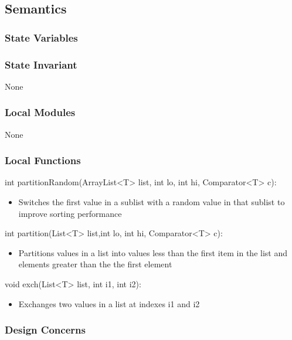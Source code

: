 \documentclass[12pt]{article}
\begin{document}
                \subsection* {Semantics}
                
                \subsubsection* {State Variables}
                
                \subsubsection* {State Invariant}
                None
                
                \subsubsection*{Local Modules}
                
                None
                
                \subsubsection*{Local Functions}
                
                \noindent int partitionRandom(ArrayList<T> list, int lo, int hi, Comparator<T> c):
			    \begin{itemize}
			        \item Switches the first value in a sublist with a random value in that sublist to improve sorting performance
			    \end{itemize}
                \noindent int partition(List<T> list,int lo, int hi, Comparator<T> c):
			    \begin{itemize}
			        \item Partitions values in a list into values less than the first item in the list and
	                elements greater than the the first element
			    \end{itemize}
                \noindent void exch(List<T> list, int i1, int i2):
			    \begin{itemize}
			        \item Exchanges two values in a list at indexes i1 and i2
			    \end{itemize}
			
                \subsubsection* {Design Concerns}
                
\end{document}
